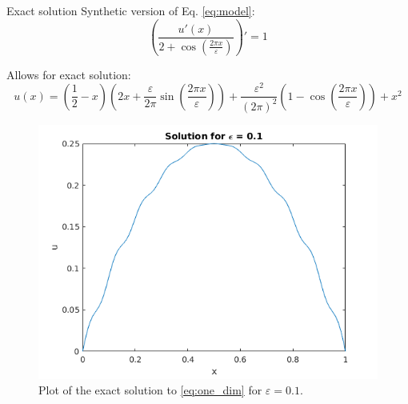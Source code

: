 \documentclass{beamer}
\renewcommand{\epsilon}{\varepsilon}
\begin{document}
\begin{frame}[t]{Exact solution}
  Synthetic version of Eq. \eqref{eq:model}:
  \begin{equation}
    \left( \frac{u'(x)}{2+\cos \left( \frac{2\pi x}{\epsilon} \right)} \right)' = 1
    \label{eq:one_dim}
  \end{equation}

  Allows for exact solution:
  \begin{equation}
    u(x) = \left( \frac{1}{2} - x \right) \left(2x + \frac{\epsilon}{2\pi}\sin\left(\frac{2\pi x}{\epsilon}\right) \right) + \frac{\epsilon^{2}}{(2\pi)^{2}}\left( 1 - \cos \left( \frac{2 \pi x}{\epsilon} \right) \right) + x^{2}
   \label{eq:one_dim_sol}
 \end{equation}
 \begin{figure}[th]
    \centering
    \includegraphics[width=0.35\linewidth]{one_dim_exact.png}
    \caption{Plot of the exact solution to \eqref{eq:one_dim} for $\epsilon=0.1 $.}
    \label{fig:one_dim_exact}
\end{figure}
\end{frame}
\end{document}
